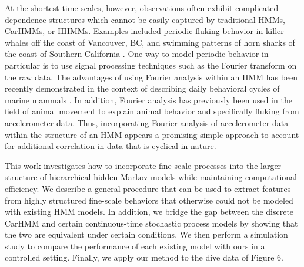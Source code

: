 At the shortest time scales, however, observations often exhibit complicated dependence structures which cannot be easily captured by traditional HMMs, CarHMMs, or HHMMs. Examples included periodic fluking behavior in killer whales off the coast of Vancouver, BC, and swimming patterns of horn sharks of the coast of Southern California \citep{Adam:2019}. 
One way to model periodic behavior in particular is to use signal processing techniques such as the Fourier transform on the raw data. 
The advantages of using Fourier analysis within an HMM has been recently demonstrated in the context of describing daily behavioral cycles of marine mammals \citep{Heerah:2017}.
In addition, Fourier analysis has previously been used in the field of animal movement to explain animal behavior \citep{Fehlmann:2017} and specifically fluking \citep{Shorter:2017} from accelerometer data. 
Thus, incorporating Fourier analysis of accelerometer data within the structure of an HMM appears a promising simple approach to account for additional correlation in data that is cyclical in nature.

This work investigates how to incorporate fine-scale processes into the larger structure of hierarchical hidden Markov models while maintaining computational efficiency. 
We describe a general procedure that can be used to extract features from highly structured fine-scale behaviors that otherwise could not be modeled with existing HMM models. 
In addition, we bridge the gap between the discrete CarHMM and certain continuous-time stochastic process models by showing that the two are equivalent under certain conditions. 
We then perform a simulation study to compare the performance of each existing model with ours in a controlled setting. 
Finally, we apply our method to the dive data of Figure 6.





